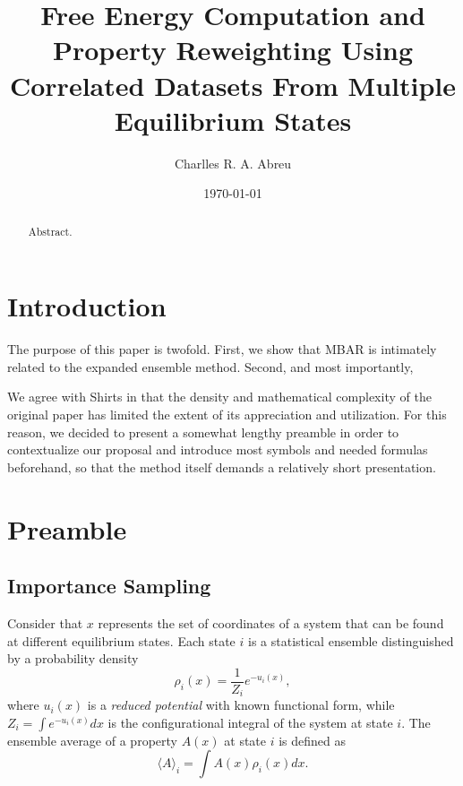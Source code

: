 \documentclass[aip,jcp,reprint,amsmath,amssymb]{revtex4-1}
\begin{document}
\title{Free Energy Computation and Property Reweighting Using Correlated Datasets From Multiple Equilibrium States}

\author{Charlles R. A. Abreu}

\date{\today}

\begin{abstract}
Abstract.
\end{abstract}

\maketitle

\section{Introduction}
\label{sec:introduction}

The purpose of this paper is twofold. First, we show that MBAR is intimately related to the expanded ensemble method. Second, and most importantly, 

We agree with Shirts\cite{Shirts_2017} in that the density and mathematical complexity of the original  paper has limited the extent of its appreciation and utilization. For this reason, we decided to present a somewhat lengthy preamble in order to contextualize our proposal and introduce most symbols and needed formulas beforehand, so that the method itself demands a relatively short presentation.

\section{Preamble}

\subsection{Importance Sampling}
\label{sec:definitions}

Consider that $x$ represents the set of coordinates of a system that can be found at different equilibrium states. Each state $i$ is a statistical ensemble distinguished by a probability density
\begin{equation}
\label{eq:state_prob_density}
\rho_i(x) = \frac{1}{Z_i} e^{-u_i(x)},
\end{equation}
where $u_i(x)$ is a \textit{reduced potential}\cite{Shirts_2008, Chodera_2011} with known functional form, while $Z_i = \int e^{-u_i(x)}dx$ is the configurational integral of the system at state $i$. The ensemble average of a property $A(x)$ at state $i$ is defined as
\begin{equation}
\label{eq:ensemble average}
\langle A \rangle_i = \int A(x)\rho_i(x)dx.
\end{equation}
\end{document}
